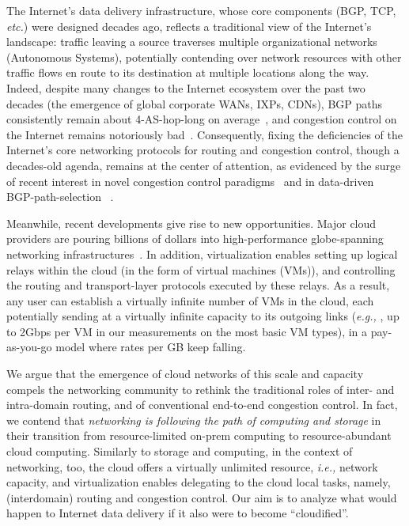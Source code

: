 \documentclass[newfonts=false,format=sigconf,10pt,letterpaper]{acmart}
\providecommand{\ie}{\emph{i.e.,} }
\providecommand{\eg}{\emph{e.g.,} }
\begin{document}
The Internet's data delivery infrastructure, whose core components (BGP, TCP, \textit{etc.}) were designed decades ago, reflects a traditional view of the Internet's landscape: traffic leaving a source traverses multiple organizational networks (Autonomous Systems), potentially contending over network resources with other traffic flows en route to its destination at multiple locations along the way. Indeed, despite many changes to the Internet ecosystem over the past two decades (the emergence of global corporate WANs, IXPs, CDNs), BGP paths consistently remain about 4-AS-hop-long on average~\cite{kuhne2012ripe,apnic2017bgp}, and congestion control on the Internet remains notoriously bad~\cite{PCC}. Consequently, fixing the deficiencies of the Internet's core networking protocols for routing and congestion control, though a decades-old agenda, remains at the center of attention, as evidenced by the surge of recent interest in novel congestion control paradigms~\cite{PCC,BBR,keqiang2016acdc} and in data-driven BGP-path-selection~\cite{yap2017taking,schlinker2017engineering}
.

Meanwhile, recent developments give rise to new opportunities. Major cloud providers are pouring billions of dollars into high-performance globe-spanning networking infrastructures~\cite{gcp2018spending,aws2018spending,microsoft2018spending}. In addition, virtualization enables setting up logical relays within the cloud (in the form of virtual machines (VMs)), and controlling the routing and transport-layer protocols executed by these relays. As a result, any user can establish a virtually infinite number of VMs in the cloud, each potentially sending at a virtually infinite capacity to its outgoing links (\eg, up to 2Gbps per VM in our measurements on the most basic VM types), in a pay-as-you-go model where rates per GB keep falling. 

We argue that the emergence of cloud networks of this scale and capacity compels the networking community to rethink the traditional roles of  inter- and intra-domain routing, and of conventional end-to-end congestion control. In fact, we contend that \textit{networking is following the path of computing and storage} in their transition from resource-limited on-prem computing to resource-abundant cloud computing.  Similarly to storage and computing, in the context of networking, too, the cloud offers a virtually unlimited resource, \ie network capacity, and virtualization enables delegating to the cloud local tasks, namely, (interdomain) routing and congestion control. Our aim is to analyze what would happen to Internet data delivery if it also were to become ``cloudified''.
\end{document}
